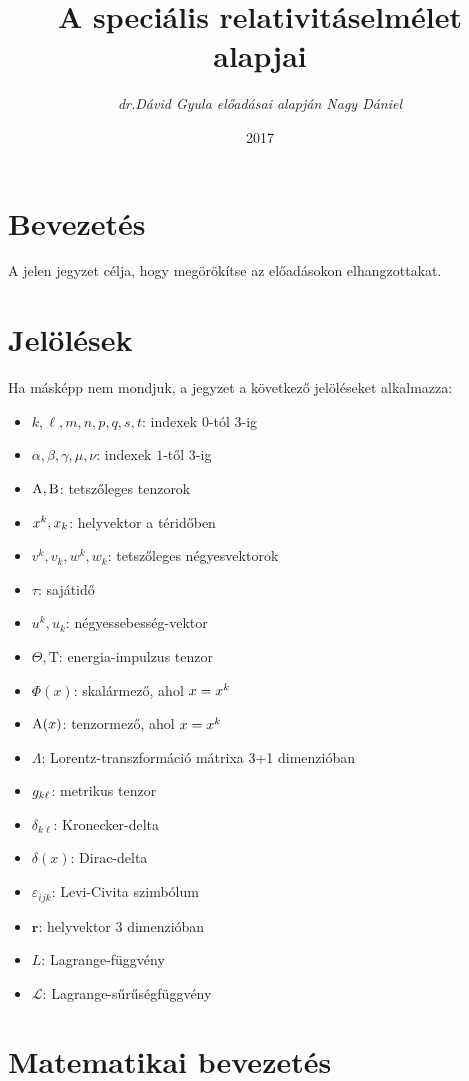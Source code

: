 \documentclass[a4paper,12pt]{article}
\title{\textbf{A speciális relativitáselmélet alapjai\\
\vspace{24pt}}}
\author{\textsl{dr.Dávid Gyula előadásai alapján Nagy Dániel}}
\date{2017}
\begin{document}
\maketitle
\pagebreak
\tableofcontents

\section{Bevezetés}
A jelen jegyzet célja, hogy megörökítse az előadásokon elhangzottakat.
\section{Jelölések}
Ha másképp nem mondjuk, a jegyzet a következő jelöléseket alkalmazza: \\
\begin{itemize}
\item $k, \ell, m, n, p, q, s, t$: indexek $0$-tól $3$-ig
\item $\alpha, \beta, \gamma, \mu, \nu$: indexek $1$-től $3$-ig
\item $\mathrm{A},\mathrm{B}$: tetszőleges tenzorok
\item $x^k, x_k$: helyvektor a téridőben
\item $v^k, v_k, w^k, w_k$: tetszőleges négyesvektorok
\item $\tau$: sajátidő
\item $u^k, u_k$: négyessebesség-vektor
\item $\Theta, \mathrm{T}$: energia-impulzus tenzor
\item $\Phi(x)$: skalármező, ahol $x=x^k$
\item $\mathrm{A}(x)$: tenzormező, ahol $x=x^k$
\item $\Lambda$: Lorentz-transzformáció mátrixa 3+1 dimenzióban
\item $g_{k\ell}$: metrikus tenzor
\item $\delta_{k\ell}$: Kronecker-delta
\item $\delta(x)$: Dirac-delta
\item $\varepsilon_{ijk}$: Levi-Civita szimbólum
\item $\mathbf{r}$: helyvektor 3 dimenzióban
\item $L$: Lagrange-függvény
\item $\mathcal{L}$: Lagrange-sűrűségfüggvény
\end{itemize}

\pagebreak

\section{Matematikai bevezetés}

\end{document}
